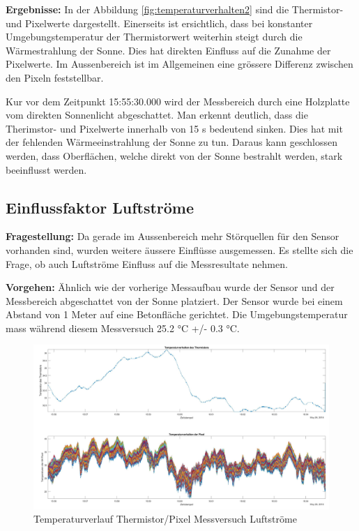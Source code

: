 \textbf{Ergebnisse:} In der Abbildung \ref{fig:temperaturverhalten2} sind die Thermistor- und Pixelwerte dargestellt. Einerseits ist ersichtlich, dass bei konstanter Umgebungstemperatur der Thermistorwert weiterhin steigt durch die Wärmestrahlung der Sonne. Dies hat direkten Einfluss auf die Zunahme der Pixelwerte. Im Aussenbereich ist im Allgemeinen eine grössere Differenz zwischen den Pixeln feststellbar.

Kur vor dem Zeitpunkt 15:55:30.000 wird der Messbereich durch eine Holzplatte vom direkten Sonnenlicht abgeschattet. Man erkennt deutlich, dass die Therimstor- und Pixelwerte innerhalb von 15 s bedeutend sinken. Dies hat mit der fehlenden Wärmeeinstrahlung der Sonne zu tun. Daraus kann geschlossen werden, dass Oberflächen, welche direkt von der Sonne bestrahlt werden, stark beeinflusst werden.

\subsection{Einflussfaktor Luftströme}
\textbf{Fragestellung:} Da gerade im Aussenbereich mehr Störquellen für den Sensor vorhanden sind, wurden weitere äussere Einflüsse ausgemessen. Es stellte sich die Frage, ob auch Luftströme Einfluss auf die Messresultate nehmen.

\textbf{Vorgehen:} Ähnlich wie der vorherige Messaufbau wurde der Sensor und der Messbereich abgeschattet von der Sonne platziert. Der Sensor wurde bei einem Abstand von 1 Meter auf eine Betonfläche gerichtet. Die Umgebungstemperatur mass während diesem Messversuch 25.2 °C +/- 0.3 °C.  
	
\begin{figure}[H]
	\centering
	\includegraphics[width=1.0\textwidth]{fig/Temperaturverhaltenwind}
	\caption[Temperaturverlauf Thermistor/Pixel Messversuch Luftströme]{Temperaturverlauf Thermistor/Pixel Messversuch Luftströme}
	\label{fig:temperaturverhaltenwind}
\end{figure}

